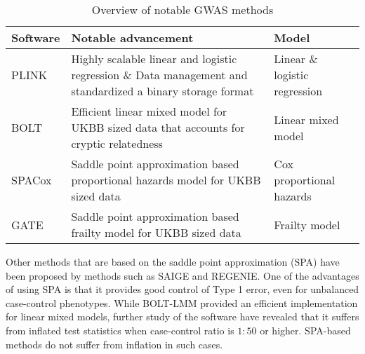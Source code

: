 \begin{table}[h]
	\centering
	\begin{tabularx}{\textwidth}{l X l}
		\hline
		Software	&	Notable advancement		&	Model \\
		\hline
		PLINK\cite{chang2015second,purcell2007plink}	&
		Highly scalable linear and logistic regression \& Data management and standardized a binary storage format	&
		Linear \& logistic regression	\\
		BOLT\cite{loh2015efficient}	&
		Efficient linear mixed model for UKBB sized data that accounts for cryptic relatedness	&
		Linear mixed model	\\
		SPACox\cite{bi2020fast}	&	
		Saddle point approximation based proportional hazards model for UKBB sized data &
		Cox proportional hazards \\
		GATE\cite{dey2022efficient}	&
		Saddle point approximation based frailty model for UKBB sized data	&
		Frailty model \\
		\hline
	\end{tabularx}
	\caption{Overview of notable GWAS methods}
	\label{table:GWASoverview}
\end{table}
Other methods that are based on the saddle point approximation (SPA)\cite{daniels1954saddlepoint,kuonen1999miscellanea} have been proposed by methods such as SAIGE\cite{zhou2018efficiently} and REGENIE\cite{mbatchou2021computationally}. One of the advantages of using SPA is that it provides good control of Type 1 error, even for unbalanced case-control phenotypes. While BOLT-LMM provided an efficient implementation for linear mixed models, further study of the software have revealed that it suffers from inflated test statistics when case-control ratio is $ 1:50 $ or higher. SPA-based methods do not suffer from inflation in such cases\cite{mbatchou2021computationally}.

